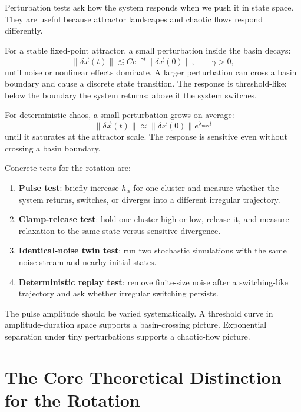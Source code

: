 Perturbation tests ask how the system responds when we push it in state space. They are useful because attractor landscapes and chaotic flows respond differently.

For a stable fixed-point attractor, a small perturbation inside the basin decays:
%
\begin{equation}
  \|\delta\vec x(t)\|
  \lesssim
  C e^{-\gamma t}\|\delta\vec x(0)\|,
  \qquad
  \gamma>0,
  \label{eq:stable-perturbation-decay}
\end{equation}
%
until noise or nonlinear effects dominate. A larger perturbation can cross a basin boundary and cause a discrete state transition. The response is threshold-like: below the boundary the system returns; above it the system switches.

For deterministic chaos, a small perturbation grows on average:
%
\begin{equation}
  \|\delta\vec x(t)\|
  \approx
  \|\delta\vec x(0)\|e^{\lambda_{\max} t}
  \label{eq:chaotic-perturbation-growth}
\end{equation}
%
until it saturates at the attractor scale. The response is sensitive even without crossing a basin boundary.

Concrete tests for the rotation are:
%
\begin{enumerate}[leftmargin=*]
  \item \textbf{Pulse test}: briefly increase $h_{\alpha}$ for one cluster and measure whether the system returns, switches, or diverges into a different irregular trajectory.
  \item \textbf{Clamp-release test}: hold one cluster high or low, release it, and measure relaxation to the same state versus sensitive divergence.
  \item \textbf{Identical-noise twin test}: run two stochastic simulations with the same noise stream and nearby initial states.
  \item \textbf{Deterministic replay test}: remove finite-size noise after a switching-like trajectory and ask whether irregular switching persists.
\end{enumerate}

The pulse amplitude should be varied systematically. A threshold curve in amplitude-duration space supports a basin-crossing picture. Exponential separation under tiny perturbations supports a chaotic-flow picture.

\section{The Core Theoretical Distinction for the Rotation}
\label{sec:core-theoretical-distinction-rotation}

